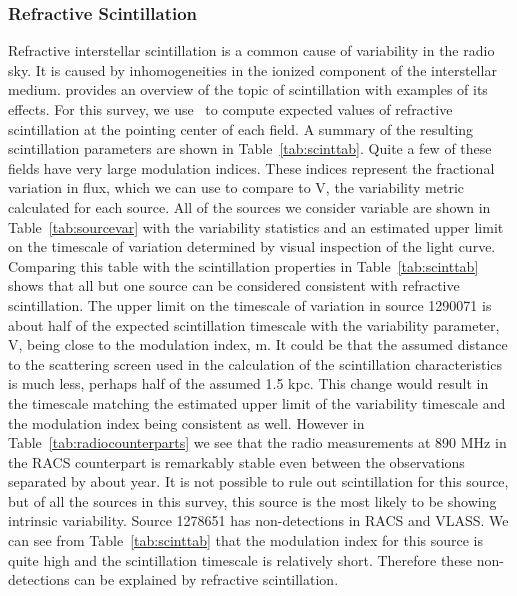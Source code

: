 \documentclass[12pt]{article}
\begin{document}
\subsubsection{Refractive Scintillation}
Refractive interstellar scintillation is a common cause of variability in the radio sky. It is caused by inhomogeneities in the ionized component of the interstellar medium. \citet{1998MNRAS.294..307W} provides an overview of the topic of scintillation with examples of its effects. For this survey, we use~\citet{2019arXiv190708395H} to compute expected values of refractive scintillation at the pointing center of each field. A summary of the resulting scintillation parameters are shown in Table~\ref{tab:scinttab}. Quite a few of these fields have very large modulation indices. These indices represent the fractional variation in flux, which we can use to compare to V, the variability metric calculated for each source. All of the sources we consider variable are shown in Table~\ref{tab:sourcevar} with the variability statistics and an estimated upper limit on the timescale of variation determined by visual inspection of the light curve. Comparing this table with the scintillation properties in Table~\ref{tab:scinttab} shows that all but one source can be considered consistent with refractive scintillation. The upper limit on the timescale of variation in source 1290071 is about half of the expected scintillation timescale with the variability parameter, V, being close to the modulation index, m. It could be that the assumed distance to the scattering screen used in the calculation of the scintillation characteristics is much less, perhaps half of the assumed 1.5 kpc. This change would result in the timescale matching the estimated upper limit of the variability timescale and the modulation index being consistent as well. However in Table~\ref{tab:radiocounterparts} we see that the radio measurements at 890 MHz in the RACS counterpart is remarkably stable even between the observations separated by about year. It is not possible to rule out scintillation for this source, but of all the sources in this survey, this source is the most likely to be showing intrinsic variability. Source 1278651 has non-detections in RACS and VLASS. We can see from Table~\ref{tab:scinttab} that the modulation index for this source is quite high and the scintillation timescale is relatively short. Therefore these non-detections can be explained by refractive scintillation. 
\end{document}
